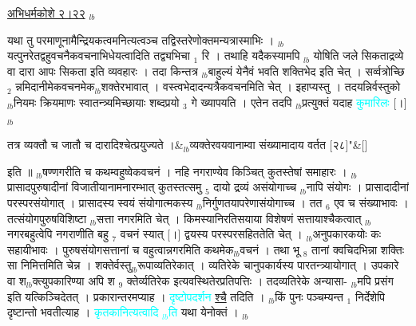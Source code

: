 \documentclass[article,12pt,a4paper]{memoir}%
\newcommand{\quotelemma}[1]{\textcolor{cyan}{#1}}
\newcounter{parCount}
\begin{document}
	  
	  
	    \pstart  \leavevmode%
	    \hphantom{.}
	  \href{http://sarit.indology.info/?cref=ak.2.22}{अभिधर्मकोशे २।२२}
	{}
	\pend%
      {\tiny $_{lb}$}

	  
	  \pstart \leavevmode%
	यथा तु परमाणूनामैन्द्रियकत्वमनित्यत्वञ्च तद्विस्तरेणोक्तमन्यत्रास्माभिः । {\tiny $_{lb}$}यत्पुनरेतद्वहुवचनैकवचनाभिधेयत्वादिति तद्व्यभिचा {\tiny $_{1}$} रि । तथाहि यदैकस्यामपि {\tiny $_{lb}$} \leavevmode{} योषिति जले सिकताद्रव्ये वा दारा आपः सिकता इति व्यवहारः । तदा किन्तत्र {\tiny $_{lb}$}बाहुल्यं येनैवं भवति शक्तिभेद इति चेत् । सर्व्वत्रोच्छि {\tiny $_{2}$} न्नमिदानीमेकवचनमेक{\tiny $_{lb}$}शक्तेरभावात् । वस्त्वभेदादन्यत्रैकवचनमिति चेत् । इहाप्यस्तु । तदयन्निर्वस्तुको {\tiny $_{lb}$}नियमः क्रियमाणः स्वातन्त्र्यमिच्छायाः शब्दप्रयो {\tiny $_{3}$} गे ख्यापयति । एतेन तदपि {\tiny $_{lb}$}प्रत्युक्तं यदाह \quotelemma{कुमारिलः} [।] {\tiny $_{lb}$} 
	    \pend%
	  
	    
	    \stanza[\smallbreak]
	  तत्र व्यक्तौ च जातौ च दारादिश्चेत्प्रयुज्यते ।&{\tiny $_{lb}$}व्यक्तेरवयवानाम्वा संख्यामादाय वर्तत [२८]{\normalfontlatin\large\qquad{}"}\&[\smallbreak]
	  
	  
	  
	    \pstart  \leavevmode%
	    \hphantom{.}
	  इति ॥ {\tiny $_{lb}$}षण्णगरीति च कथम्वहुष्वेकवचनं । नहि नगराण्येव किञ्चित् कुतस्तेषां समाहारः । {\tiny $_{lb}$}प्रासादपुरुषादीनां विजातीयानामनारम्भात् कुतस्तत्समु {\tiny $_{5}$} दायो द्रव्यं असंयोगाच्च {\tiny $_{lb}$}नापि संयोगः । प्रासादादीनां परस्परसंयोगात् । प्रासादस्य स्वयं संयोगात्मकस्य {\tiny $_{lb}$}निर्गुणतयापरेणासंयोगाच्च । तत {\tiny $_{6}$} एव च संख्याभावः । तत्संयोगपुरुषविशिष्टा {\tiny $_{lb}$}सत्ता नगरमिति चेत् । किमस्यानिरतिसयाया विशेषणं सत्तायाश्चैकत्वात् {\tiny $_{lb}$}नगरबहुत्वेपि नगराणीति बहु {\tiny $_{7}$} वचनं स्यात् [।] द्वयस्य परस्परसहिततेति चेत् । {\tiny $_{lb}$}अनुपकारकयोः कः सहायीभावः । पुरुषसंयोगसत्तानां च वहुत्वान्नगरमिति कथमेक{\tiny $_{lb}$}वचनं । तथा भू {\tiny $_{8}$} तानां क्वचिदभिन्ना शक्तिः सा निमित्तमिति चेन्न । शक्तेर्वस्तु{\tiny $_{lb}$}रूपाव्यतिरेकात् । व्यतिरेके चानुपकार्यस्य पारतन्त्र्यायोगात् । उपकारे वा श{\tiny $_{lb}$}क्त्युपकारिण्या अपि श {\tiny $_{9}$} \leavevmode{} क्तेर्व्यतिरेक इत्यवस्थितेरप्रतिपत्तिः । तदव्यतिरेके अन्यासा- {\tiny $_{lb}$}मपि प्रसंग इति यत्किञ्चिदेतत् । प्रकारान्तरमप्याह । \quotelemma{दृष्टोपदर्शन} \uline{श्चै} तदिति । {\tiny $_{lb}$}किं पुनः पञ्चम्यन्त {\tiny $_{1}$} निर्देशेपि दृष्टान्तो भवतीत्याह । \quotelemma{कृतकानित्यत्वादि \cite[10b7]{vn-msN} {\tiny $_{lb}$}ति} यथा येनोक्तं । {\tiny $_{lb}$} 
	    \pend%
	  
\end{document}

